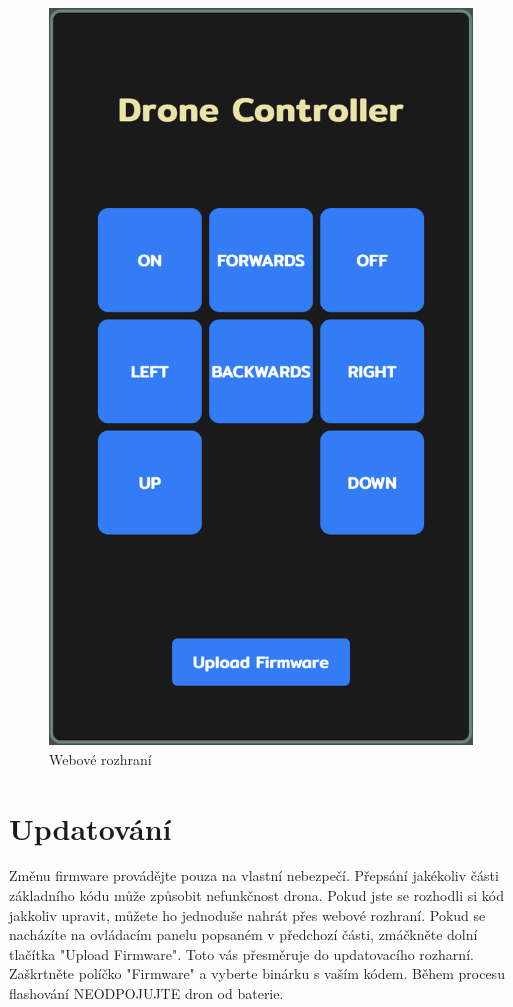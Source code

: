     \begin{figure}[h]
        \centering
        \includegraphics[scale=0.4]{img/gui.png}
        \caption{Webové rozhraní}
    \end{figure}

\newpage
    
\section{Updatování}
    Změnu firmware provádějte pouza na vlastní nebezpečí. Přepsání jakékoliv části základního kódu může způsobit nefunkčnost drona. Pokud jste se rozhodli si kód jakkoliv upravit, můžete ho jednoduše nahrát přes webové rozhraní. Pokud se nacházíte na ovládacím panelu popsaném v předchozí části, zmáčkněte dolní tlačítka "Upload Firmware". Toto vás přesměruje do updatovacího rozharní. Zaškrtněte políčko "Firmware" a vyberte binárku s vaším kódem. Během procesu flashování NEODPOJUJTE dron od baterie.

